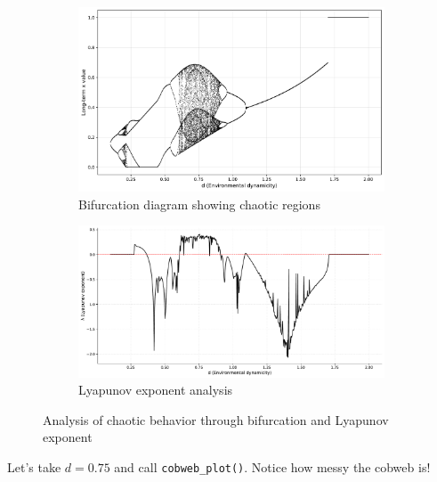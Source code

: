 \documentclass[a4paper, 10pt]{article}
\begin{document}
\begin{figure}[h]
    \centering
    \begin{subfigure}{0.48\textwidth}
        \centering
        \includegraphics[width=\textwidth]{../images/int-cases/chaotic-bifurcation.pdf}
        \caption{Bifurcation diagram showing chaotic regions}
        \label{fig:chaotic-bifurcation}
    \end{subfigure}
    \hfill
    \begin{subfigure}{0.48\textwidth}
        \centering
        \includegraphics[width=\textwidth]{../images/int-cases/chaotic-lyapunov.pdf}
        \caption{Lyapunov exponent analysis}
        \label{fig:chaotic-lyapunov}
    \end{subfigure}
    \caption{Analysis of chaotic behavior through bifurcation and Lyapunov exponent}
    \label{fig:chaos-analysis}
\end{figure}

Let's take $d = 0.75$ and call \texttt{cobweb\_plot()}. Notice how messy the cobweb is!
\end{document}
